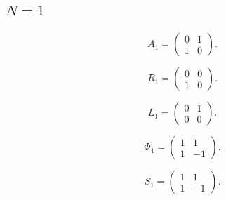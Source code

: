 \subsection{$N=1$}
\label{tab:matrices-N01}
\begingroup
\small
\setlength{\arraycolsep}{3pt}
\[
A_{1}=\begin{pmatrix}
0 & 1 \\
1 & 0
\end{pmatrix}.
\]
\endgroup

\begingroup
\small
\setlength{\arraycolsep}{3pt}
\[
R_{1}=\begin{pmatrix}
0 & 0 \\
1 & 0
\end{pmatrix}.
\]
\endgroup

\begingroup
\small
\setlength{\arraycolsep}{3pt}
\[
L_{1}=\begin{pmatrix}
0 & 1 \\
0 & 0
\end{pmatrix}.
\]
\endgroup

\begingroup
\small
\setlength{\arraycolsep}{3pt}
\[
\Phi_{1}=\begin{pmatrix}
1 & 1 \\
1 & -1
\end{pmatrix}.
\]
\endgroup

\begingroup
\small
\setlength{\arraycolsep}{3pt}
\[
S_{1}=\begin{pmatrix}
1 & 1 \\
1 & -1
\end{pmatrix}.
\]
\endgroup

